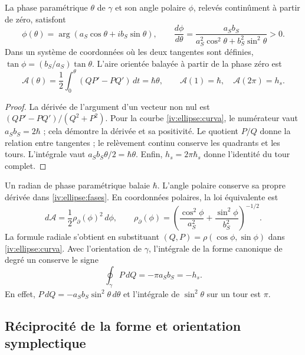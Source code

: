 \begin{proposition}
\label{iv:ellipse:ley-areal}
La phase paramétrique \(\theta\) de \(\gamma\) et son angle
polaire \(\phi\), relevés continûment à partir de zéro, satisfont
\begin{equation}
 \phi(\theta)=\arg(a_S\cos\theta+i b_S\sin\theta),\qquad
 \frac{d\phi}{d\theta}
 =\frac{a_Sb_S}{a_S^2\cos^2\theta+b_S^2\sin^2\theta}>0.
 \label{iv:ellipse:fases}
\end{equation}
Dans un système de coordonnées où les deux tangentes sont définies,
\(\tan\phi=(b_S/a_S)\tan\theta\). L’aire orientée balayée
à partir de la phase zéro est
\begin{equation}
 \mathcal A(\theta)=
 \frac12\int_0^\theta(QP'-PQ')\,dt=\hbar\theta,
 \qquad
 \mathcal A(1)=\hbar,\quad\mathcal A(2\pi)=h_s.
 \label{iv:ellipse:area-fase}
\end{equation}
\end{proposition}
\begin{proof}
La dérivée de l’argument d’un vecteur non nul est
\((QP'-PQ')/(Q^2+P^2)\). Pour la courbe
\eqref{iv:ellipse:curva}, le numérateur vaut
\(a_Sb_S=2\hbar\) ; cela démontre la dérivée et sa
positivité. Le quotient \(P/Q\) donne la relation entre tangentes ;
le relèvement continu conserve les quadrants et les tours.
L’intégrale vaut \(a_Sb_S\theta/2=\hbar\theta\).
Enfin, \(h_s=2\pi\hbar_s\) donne l’identité du
tour complet.

\end{proof}

Un radian de phase paramétrique balaie \(\hbar\). L’angle
polaire conserve sa propre dérivée dans
\eqref{iv:ellipse:fases}. En coordonnées polaires, la loi
équivalente est
\[
 d\mathcal A=\frac12\rho_{\partial}(\phi)^2\,d\phi,\qquad
 \rho_{\partial}(\phi)=
 \left(\frac{\cos^2\phi}{a_S^2}
       +\frac{\sin^2\phi}{b_S^2}\right)^{-1/2}.
\]
La formule radiale s’obtient en substituant
\((Q,P)=\rho(\cos\phi,\sin\phi)\) dans
\eqref{iv:ellipse:curva}. Avec l’orientation de
\(\gamma\), l’intégrale de la forme canonique de degré un conserve
le signe
\begin{equation}
 \oint_\gamma P\,dQ=-\pi a_Sb_S=-h_s.
 \label{iv:ellipse:accion-orientada}
\end{equation}
En effet, \(P\,dQ=-a_Sb_S\sin^2\theta\,d\theta\) et
l’intégrale de \(\sin^2\theta\) sur un tour est \(\pi\).

\subsection{Réciprocité de la forme et orientation symplectique}
\label{iv:ellipse:reciprocidad}

